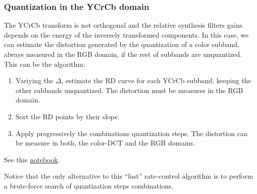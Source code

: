 \subsubsection{Quantization in the YCrCb domain}
The YCrCb transform is not orthogonal and the relative synthesis
filters gains depends on the energy of the inversely transformed
components. In this case, we can estimate the distortion generated by
the quantization of a color subband, always measured in the RGB
domain, if the rest of subbands are unquantized. This can be the
algorithm:
\begin{enumerate}
\item Variying the $\Delta$, estimate the RD curve for each YCrCb
  subband, keeping the other subbands unquantized. The distortion must
  be measures in the RGB domain.
\item Sort the RD points by their slope.
\item Apply progressively the combinations quantization steps. The
  distortion can be measure in both, the color-DCT and the RGB
  domains.
\end{enumerate}
See this \href{https://github.com/Sistemas-Multimedia/Sistemas-Multimedia.github.io/blob/master/study_guide/06-color_transform/YCrCb_compression.ipynb}{notebook}.

Notice that the only alternative to this ``fast'' rate-control
algorithm is to perform a brute-force search of quantization steps
combinations.

\begin{comment}
The synthesis filters gains are important because the quantization steps of each YCrCb component should be adjusted in order to effectively provide the desired number of \href{http://www.winlab.rutgers.edu/~crose/322_html/quantization.pdf}{bins} (different dequantized values) in each component.

The synthesis filters generates a gain of $||1^2 + 1^2 + 1^2||_2^2=3$
(square of the Euclidean norm) for the $\text{Y}$ component, $||1.402^2 + 0.714^2 +
0^2||_2^2=2.4754$ for the $\text{Cr}$ component, and $||0^2 + 0.344^2+
1.772^2||_2^2=3.25832$ for the $\text{Cb}$ component. So, when
compressing an image through quantization, the QSs should be modulated
accordinly (the higher the gain, the higher the quantization error,
and therefore, the smaller the QS should be).
\end{comment}

